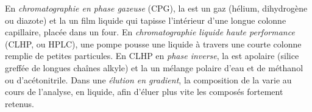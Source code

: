 \begin{definition}\label{def:b2:chromatography:techniques}
En \emph{chromatographie en phase gazeuse} (CPG), la 
est un gaz (hélium, dihydrogène ou diazote) et la  un film liquide qui tapisse
l'intérieur d'une longue colonne capillaire, placée dans un four. En \emph{chromatographie liquide haute
performance}
(CLHP, ou HPLC), une pompe pousse une  liquide à travers une courte colonne remplie de
petites particules. En CLHP en \emph{phase inverse}, la  est
apolaire (silice greffée de longues chaînes alkyle) et la  un mélange polaire d'eau et de
méthanol ou d'acétonitrile. Dans une \emph{élution en gradient},
la composition de la  varie au cours de l'analyse, en  liquide, afin d'éluer
plus vite les composés fortement retenus.
\end{definition}

